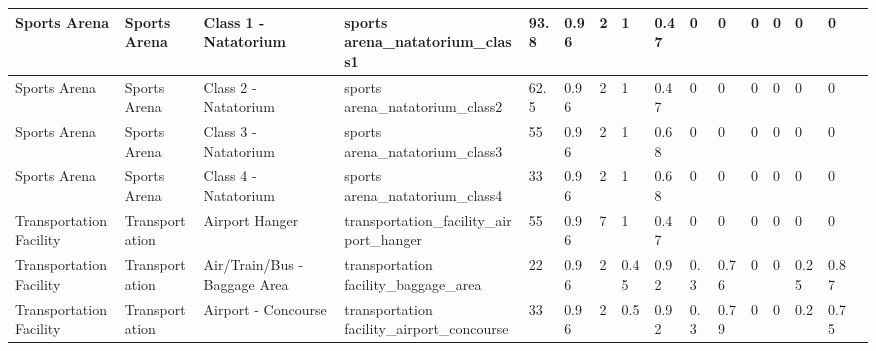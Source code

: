 \begin{center}
\begin{landscape}
\begin{longtable}{|p{0.75in}|p{0.75in}|p{0.75in}|p{0.75in}|p{0.3in}|p{0.3in}|p{0.3in}|p{0.3in}|p{0.3in}|p{0.3in}|p{0.3in}|p{0.3in}|p{0.3in}|p{0.3in}|p{0.3in}|p{0.6in}|}
      Sports Arena                            & Sports Arena                & Class 1 - Natatorium                            & sports arena\_natatorium\_class1                                & 93.8 & 0.96 & 2  & 1      & 0.47  & 0     & 0     & 0    & 0    & 0    & 0    &                                                                                       \\ \hline
      Sports Arena                            & Sports Arena                & Class 2 - Natatorium                            & sports arena\_natatorium\_class2                                & 62.5 & 0.96 & 2  & 1      & 0.47  & 0     & 0     & 0    & 0    & 0    & 0    &                                                                                       \\ \hline
      Sports Arena                            & Sports Arena                & Class 3 - Natatorium                            & sports arena\_natatorium\_class3                                & 55   & 0.96 & 2  & 1      & 0.68  & 0     & 0     & 0    & 0    & 0    & 0    &                                                                                       \\ \hline
      Sports Arena                            & Sports Arena                & Class 4 - Natatorium                            & sports arena\_natatorium\_class4                                & 33   & 0.96 & 2  & 1      & 0.68  & 0     & 0     & 0    & 0    & 0    & 0    &                                                                                       \\ \hline
      Transportation Facility                 & Transportation              & Airport Hanger                                  & transportation\_facility\_airport\_hanger                       & 55   & 0.96 & 7  & 1      & 0.47  & 0     & 0     & 0    & 0    & 0    & 0    &                                                                                       \\ \hline
      Transportation Facility                 & Transportation              & Air/Train/Bus - Baggage Area                    & transportation facility\_baggage\_area                          & 22   & 0.96 & 2  & 0.45   & 0.92  & 0.3   & 0.76  & 0    & 0    & 0.25 & 0.87 &                                                                                       \\ \hline
      Transportation Facility                 & Transportation              & Airport - Concourse                             & transportation facility\_airport\_concourse                     & 33   & 0.96 & 2  & 0.5    & 0.92  & 0.3   & 0.79  & 0    & 0    & 0.2  & 0.75 &                                                                                       \\ \hline

\end{longtable}
\end{landscape}
\end{center}
